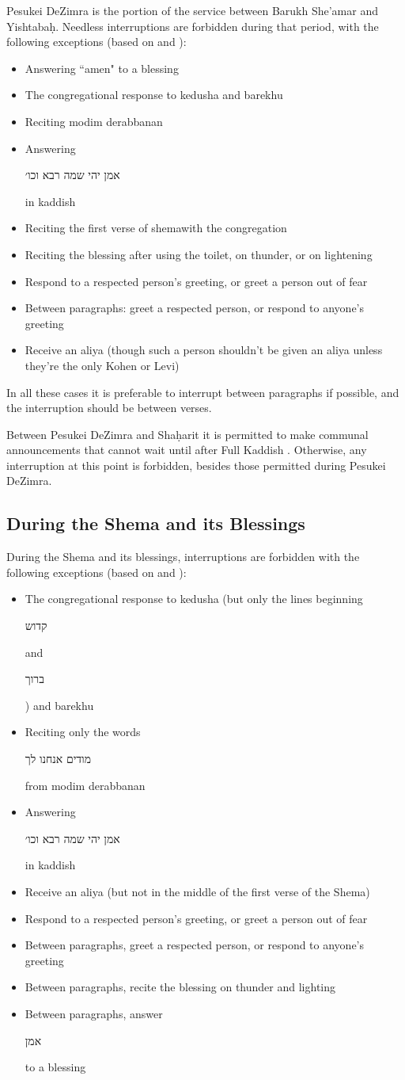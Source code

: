 \documentclass[11pt]{article}
\newcommand{\hebword}[1]{‎\begin{hebrew}\beginR #1 \endR\end{hebrew}}
\newcommand{\heth}{\d{h}}
\begin{document}
Pesukei DeZimra is the portion of the service between Barukh She'amar and Yishtaba\heth . Needless interruptions are forbidden during that period, with the following exceptions (based on \cite*[``Table of Permitted Responses"]{Koren} and \cite*[16:5]{PH}):
\begin{itemize}
	\item Answering ``amen" to a blessing 
	\item The congregational response to kedusha and barekhu
	\item Reciting modim derabbanan
	\item Answering \hebword{אמן יהי שמה רבא וכו׳} in kaddish
	\item Reciting the first verse of shema\space with the congregation
	\item Reciting the blessing after using the toilet, on thunder, or on lightening
	\item Respond to a respected person's greeting, or greet a person out of fear
	\item Between paragraphs: greet a respected person, or respond to anyone's greeting
	\item Receive an aliya (though such a person shouldn't be given an aliya unless they're the only Kohen or Levi)
\end{itemize}

In all these cases it is preferable to interrupt between paragraphs if possible, and the interruption should be between verses.

Between Pesukei DeZimra and Sha\heth arit it is permitted to make communal announcements that cannot wait until after Full Kaddish \parencite*[16:2]{PH}.  Otherwise, any interruption at this point is forbidden, besides those permitted during Pesukei DeZimra.

\subsection{During the Shema and its Blessings}

During the Shema and its blessings, interruptions are forbidden with the following exceptions (based on \cite*[``Table of Permitted Responses"]{Koren} and \cite*[16:5]{PH}):
\begin{itemize}
	\item The congregational response to kedusha (but only the lines beginning \hebword{קדוש} and \hebword{ברוך}) and barekhu
	\item Reciting only the words \hebword{מודים אנחנו לך} from modim derabbanan
	\item Answering \hebword{אמן יהי שמה רבא וכו׳} in kaddish
	\item Receive an aliya (but not in the middle of the first verse of the Shema)
	\item Respond to a respected person's greeting, or greet a person out of fear
	\item Between paragraphs, greet a respected person, or respond to anyone's greeting
	\item Between paragraphs, recite the blessing on thunder and lighting
	\item Between paragraphs, answer \hebword{אמן} to a blessing
\end{itemize}
\end{document}
